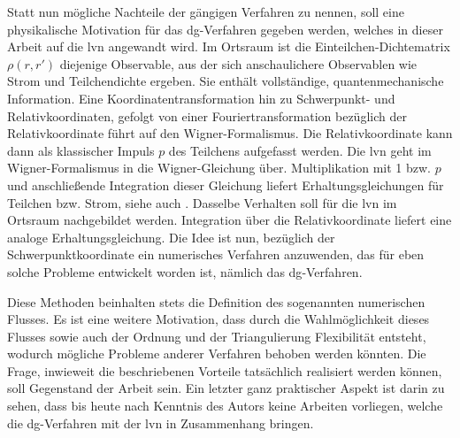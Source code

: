 Statt nun mögliche Nachteile der gängigen Verfahren zu nennen, soll eine physikalische Motivation für das \ac{dg}-Verfahren gegeben werden, welches in dieser Arbeit auf die \ac{lvn} angewandt wird.  Im Ortsraum ist die Einteilchen-Dichtematrix $\rho(r,r')$ diejenige Observable, aus der sich anschaulichere Observablen wie Strom und Teilchendichte ergeben. Sie enthält vollständige, quantenmechanische Information. Eine Koordinatentransformation hin zu Schwerpunkt- und Relativkoordinaten, gefolgt von einer Fouriertransformation bezüglich der Relativkoordinate führt auf den Wigner-Formalismus. Die Relativkoordinate kann dann als klassischer Impuls $p$ des Teilchens aufgefasst werden. Die \ac{lvn} geht im Wigner-Formalismus in die Wigner-Gleichung über. Multiplikation mit 1 bzw. $p$ und anschließende Integration dieser Gleichung liefert Erhaltungsgleichungen für Teilchen bzw. Strom, siehe auch \cite{gardner1998approximation}. Dasselbe Verhalten soll für die \ac{lvn} im Ortsraum nachgebildet werden.
Integration über die Relativkoordinate liefert eine analoge Erhaltungsgleichung. Die Idee ist nun, bezüglich der Schwerpunktkoordinate ein numerisches Verfahren anzuwenden, das für eben solche Probleme entwickelt worden ist, nämlich das \ac{dg}-Verfahren.

Diese Methoden beinhalten stets die Definition des sogenannten numerischen Flusses. Es ist eine weitere Motivation, dass durch die Wahlmöglichkeit dieses Flusses sowie auch der Ordnung und der Triangulierung Flexibilität entsteht, wodurch mögliche Probleme anderer Verfahren behoben werden könnten. Die Frage, inwieweit die beschriebenen Vorteile tatsächlich realisiert werden können, soll Gegenstand der Arbeit sein. Ein letzter ganz praktischer Aspekt ist darin zu sehen, dass bis heute nach Kenntnis des Autors keine Arbeiten vorliegen, welche die \ac{dg}-Verfahren mit der \ac{lvn} in Zusammenhang bringen.
